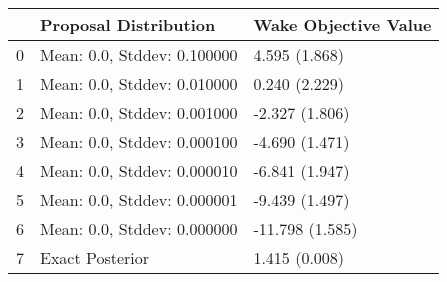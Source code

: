 \begin{tabular}{lll}
\toprule
 & Proposal Distribution & Wake Objective Value \\
\midrule
0 & Mean: 0.0, Stddev: 0.100000 & 4.595 (1.868) \\
1 & Mean: 0.0, Stddev: 0.010000 & 0.240 (2.229) \\
2 & Mean: 0.0, Stddev: 0.001000 & -2.327 (1.806) \\
3 & Mean: 0.0, Stddev: 0.000100 & -4.690 (1.471) \\
4 & Mean: 0.0, Stddev: 0.000010 & -6.841 (1.947) \\
5 & Mean: 0.0, Stddev: 0.000001 & -9.439 (1.497) \\
6 & Mean: 0.0, Stddev: 0.000000 & -11.798 (1.585) \\
7 & Exact Posterior & 1.415 (0.008) \\
\bottomrule
\end{tabular}
